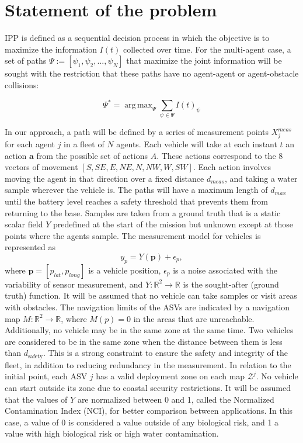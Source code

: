 \documentclass[journal]{IEEEtran}
\DeclareMathOperator*{\argmax}{arg\,max}
\newcommand\vect[1]{\boldsymbol{#1}}
\begin{document}
\section{Statement of the problem}


IPP is defined as a sequential decision process in which the objective is to maximize the information $I(t)$ collected over time. For the multi-agent case, a set of paths $\Psi:=  \left[ \psi_1, \psi_2, ..., \psi_N  \right]$ that maximize the joint information will be sought with the restriction that these paths have no agent-agent or agent-obstacle collisions:

\begin{equation}
    \Psi^* = \argmax_{\Psi} \sum_{\psi \in \Psi} I(t)_{\psi}
\end{equation}

In our approach, a path will be defined by a series of measurement points $X_j^{meas}$ for each agent $j$ in a fleet of $N$ agents. Each vehicle will take at each instant $t$ an action $\vect{a}$ from the possible set of actions $A$. These actions correspond to the 8 vectors of movement $[S,SE,E,NE,N,NW,W,SW]$. Each action involves moving the agent in that direction over a fixed distance $d_{meas}$, and taking a water sample wherever the vehicle is. The paths will have a maximum length of $d_{max}$ until the battery level reaches a safety threshold that prevents them from returning to the base. Samples are taken from a ground truth that is a static scalar field $Y$ predefined at the start of the mission but unknown except at those points where the agents sample. 
The measurement model for vehicles is represented as 
\[
    y_p = Y(\vect{p}) + \epsilon_p,
\]
where $\vect{p} = \left[ p_{lat}, p_{long}\right]$ is a vehicle position, $\epsilon_p$ is a noise associated with the variability of sensor measurement, and $Y: \mathbb{R}^2 \rightarrow \mathbb{R}$ is the sought-after (ground truth) function. 
It will be assumed that no vehicle can take samples or visit areas with obstacles. 
The navigation limits of the ASVs are indicated by a navigation map $M: \mathbb{R}^2 \rightarrow \mathbb{R}$, where $M(p) = 0$ in the areas that are unreachable. Additionally, no vehicle may be in the same zone at the same time. Two vehicles are considered to be in the same zone when the distance between them is less than $d_{\mathrm{safety}}$. This is a strong constraint to ensure the safety and integrity of the fleet, in addition to reducing redundancy in the measurement. 
In relation to the initial point, each ASV $j$ has a valid deployment zone on each map $\mathcal{Z}^j$. No vehicle can start outside its zone due to coastal security restrictions. It will be assumed that the values of $Y$ are normalized between 0 and 1, called the Normalized Contamination Index (NCI), for better comparison between applications. In this case, a value of 0 is considered a value outside of any biological risk, and 1 a value with high biological risk or high water contamination. 
\end{document}
